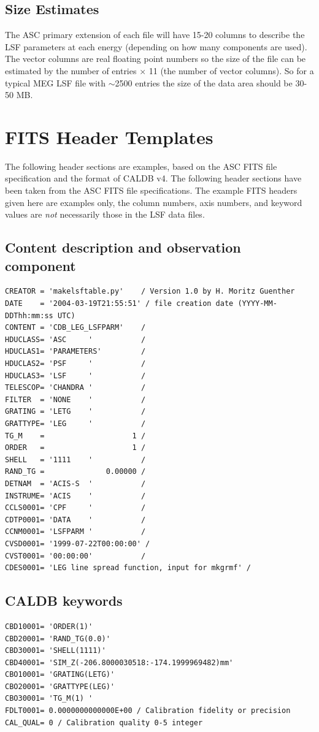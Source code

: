 \documentclass[twoside]{article}
\begin{document}
\subsection{Size Estimates}

The ASC primary extension of each file will have 15-20 columns to
describe the LSF parameters at each energy (depending on how many
components are used). The vector columns are real floating point
numbers so the size of the file can be estimated by the number of
entries $\times$ 11 (the number of vector columns). So for a typical
MEG LSF file with $\sim$2500 entries the size of the data area should
be 30-50 MB.

\section{FITS Header Templates}

The following header sections are examples, based on the ASC FITS file
specification and the format of CALDB v4.  The following header
sections have been taken from the ASC FITS file specifications. The
example FITS headers given here are examples only, the column numbers,
axis numbers, and keyword values are {\it not} necessarily those in
the LSF data files.

\subsection{Content description and observation component}
\begin{verbatim}
CREATOR = 'makelsftable.py'    / Version 1.0 by H. Moritz Guenther
DATE    = '2004-03-19T21:55:51' / file creation date (YYYY-MM-DDThh:mm:ss UTC)
CONTENT = 'CDB_LEG_LSFPARM'    /
HDUCLASS= 'ASC     '           /
HDUCLAS1= 'PARAMETERS'         /
HDUCLAS2= 'PSF     '           /
HDUCLAS3= 'LSF     '           /
TELESCOP= 'CHANDRA '           /
FILTER  = 'NONE    '           /
GRATING = 'LETG    '           /
GRATTYPE= 'LEG     '           /
TG_M    =                    1 /
ORDER   =                    1 /
SHELL   = '1111    '           /
RAND_TG =              0.00000 /
DETNAM  = 'ACIS-S  '           /
INSTRUME= 'ACIS    '           /
CCLS0001= 'CPF     '           /
CDTP0001= 'DATA    '           /
CCNM0001= 'LSFPARM '           /
CVSD0001= '1999-07-22T00:00:00' /
CVST0001= '00:00:00'           /
CDES0001= 'LEG line spread function, input for mkgrmf' /
\end{verbatim}

\subsection{CALDB keywords}
\begin{verbatim}
CBD10001= 'ORDER(1)'
CBD20001= 'RAND_TG(0.0)'
CBD30001= 'SHELL(1111)'
CBD40001= 'SIM_Z(-206.8000030518:-174.1999969482)mm'
CBO10001= 'GRATING(LETG)'
CBO20001= 'GRATTYPE(LEG)'
CBO30001= 'TG_M(1) '
FDLT0001= 0.0000000000000E+00 / Calibration fidelity or precision
CAL_QUAL= 0 / Calibration quality 0-5 integer
\end{verbatim}
\end{document}
